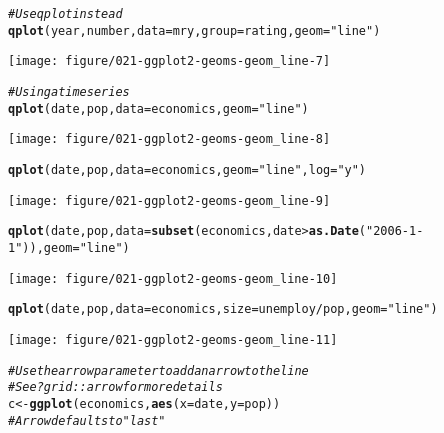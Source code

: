 \documentclass[a4paper,titlepage]{tufte-handout}\usepackage[]{graphicx}\usepackage[]{color}
\makeatletter
\def\maxwidth{ %
  \ifdim\Gin@nat@width>\linewidth
    \linewidth
  \else
    \Gin@nat@width
  \fi
}
\newcommand{\hlstr}[1]{\textcolor[rgb]{0.192,0.494,0.8}{#1}}%
\newcommand{\hlcom}[1]{\textcolor[rgb]{0.678,0.584,0.686}{\textit{#1}}}%
\newcommand{\hlopt}[1]{\textcolor[rgb]{0,0,0}{#1}}%
\newcommand{\hlstd}[1]{\textcolor[rgb]{0.345,0.345,0.345}{#1}}%
\newcommand{\hlkwb}[1]{\textcolor[rgb]{0.69,0.353,0.396}{#1}}%
\newcommand{\hlkwc}[1]{\textcolor[rgb]{0.333,0.667,0.333}{#1}}%
\newcommand{\hlkwd}[1]{\textcolor[rgb]{0.737,0.353,0.396}{\textbf{#1}}}%
\newenvironment{kframe}{%
 \def\at@end@of@kframe{}%
 \ifinner\ifhmode%
  \def\at@end@of@kframe{\end{minipage}}%
  \begin{minipage}{\columnwidth}%
 \fi\fi%
 \def\FrameCommand##1{\hskip\@totalleftmargin \hskip-\fboxsep
 \colorbox{shadecolor}{##1}\hskip-\fboxsep
     \hskip-\linewidth \hskip-\@totalleftmargin \hskip\columnwidth}%
 \MakeFramed {\advance\hsize-\width
   \@totalleftmargin\z@ \linewidth\hsize
   \@setminipage}}%
 {\par\unskip\endMakeFramed%
 \at@end@of@kframe}
\newenvironment{knitrout}{}{} %
\makeatother
\begin{document}
\begin{knitrout}
\begin{kframe}\begin{alltt}
\hlcom{# Use qplot instead}
\hlkwd{qplot}\hlstd{(year, number,} \hlkwc{data}\hlstd{=mry,} \hlkwc{group}\hlstd{=rating,} \hlkwc{geom}\hlstd{=}\hlstr{"line"}\hlstd{)}
\end{alltt}
\end{kframe}
\texttt{[image: figure/021-ggplot2-geoms-geom\_line-7]} 
\begin{kframe}\begin{alltt}
\hlcom{# Using a time series}
\hlkwd{qplot}\hlstd{(date, pop,} \hlkwc{data}\hlstd{=economics,} \hlkwc{geom}\hlstd{=}\hlstr{"line"}\hlstd{)}
\end{alltt}
\end{kframe}
\texttt{[image: figure/021-ggplot2-geoms-geom\_line-8]} 
\begin{kframe}\begin{alltt}
\hlkwd{qplot}\hlstd{(date, pop,} \hlkwc{data}\hlstd{=economics,} \hlkwc{geom}\hlstd{=}\hlstr{"line"}\hlstd{,} \hlkwc{log}\hlstd{=}\hlstr{"y"}\hlstd{)}
\end{alltt}
\end{kframe}
\texttt{[image: figure/021-ggplot2-geoms-geom\_line-9]} 
\begin{kframe}\begin{alltt}
\hlkwd{qplot}\hlstd{(date, pop,} \hlkwc{data}\hlstd{=}\hlkwd{subset}\hlstd{(economics, date} \hlopt{>} \hlkwd{as.Date}\hlstd{(}\hlstr{"2006-1-1"}\hlstd{)),} \hlkwc{geom}\hlstd{=}\hlstr{"line"}\hlstd{)}
\end{alltt}
\end{kframe}
\texttt{[image: figure/021-ggplot2-geoms-geom\_line-10]} 
\begin{kframe}\begin{alltt}
\hlkwd{qplot}\hlstd{(date, pop,} \hlkwc{data}\hlstd{=economics,} \hlkwc{size}\hlstd{=unemploy}\hlopt{/}\hlstd{pop,} \hlkwc{geom}\hlstd{=}\hlstr{"line"}\hlstd{)}
\end{alltt}
\end{kframe}
\texttt{[image: figure/021-ggplot2-geoms-geom\_line-11]} 
\begin{kframe}\begin{alltt}
\hlcom{# Use the arrow parameter to add an arrow to the line}
\hlcom{# See ?grid::arrow for more details}
\hlstd{c} \hlkwb{<-} \hlkwd{ggplot}\hlstd{(economics,} \hlkwd{aes}\hlstd{(}\hlkwc{x} \hlstd{= date,} \hlkwc{y} \hlstd{= pop))}
\hlcom{# Arrow defaults to "last"}

\end{alltt}
\end{kframe}
\end{knitrout}
\end{document}
